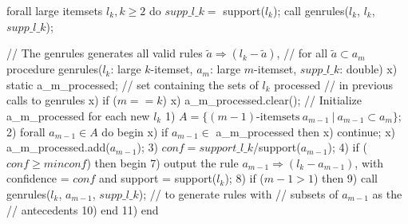 forall large itemsets $l_k, k \geq 2$ do
  $supp\_l\_k =$ support($l_k$);
  call genrules($l_k$, $l_k$, $supp\_l\_k$);

// The genrules generates all valid rules $\tilde{a}\Rightarrow(l_k - \tilde{a})$,
// for all $\tilde{a} \subset a_m$
procedure genrules($l_k$: large $k$-itemset,
                   $a_m$: large $m$-itemset,
                   $supp\_l\_k$: double)
x)  static a_m_processed; // set containing the sets of $l_k$ processed
                          // in previous  calls to genrules
x)  if ($m == k$)
x)    a_m_processed.clear(); // Initialize a_m_processed for each new $l_k$
1)    $A = \{(m-1)\textrm{-itemsets}\  a_{m-1} \ | \ a_{m-1} \subset a_m\}$;
2)    forall $a_{m-1} \in A$ do begin
x)      if $a_{m-1} \in$ a_m_processed then
x)        continue;
x)      a_m_processed.add($a_{m-1}$);
3)      $conf = support\_l\_k$/support($a_{m-1}$);
4)      if ($conf \geq minconf$) then begin
7)        output the rule $a_{m-1} \Rightarrow (l_k - a_{m-1})$,
              with confidence = $conf$ 
                  and support = support($l_k$);
8)      if ($m - 1 > 1$) then
9)        call genrules($l_k$, $a_{m-1}$, $supp\_l\_k$); // to generate rules with
                                            // subsets of $a_{m-1}$ as the
                                            // antecedents
10)   end
11) end
